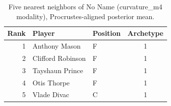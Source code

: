 \begin{table}[htbp]
  \centering\small
  \begin{tabular}{rllc}
    \toprule
    Rank & Player & Position & Archetype \\
    \midrule
    1 & Anthony Mason & F & 1 \\
    2 & Clifford Robinson & F & 1 \\
    3 & Tayshaun Prince & F & 1 \\
    4 & Otis Thorpe & F & 1 \\
    5 & Vlade Divac & C & 1 \\
    \bottomrule
  \end{tabular}
  \caption{Five nearest neighbors of No Name (curvature_m4 modality), Procrustes-aligned posterior mean.}
  \label{tab:No_Name_neighbors_curvature_m4}
\end{table}

